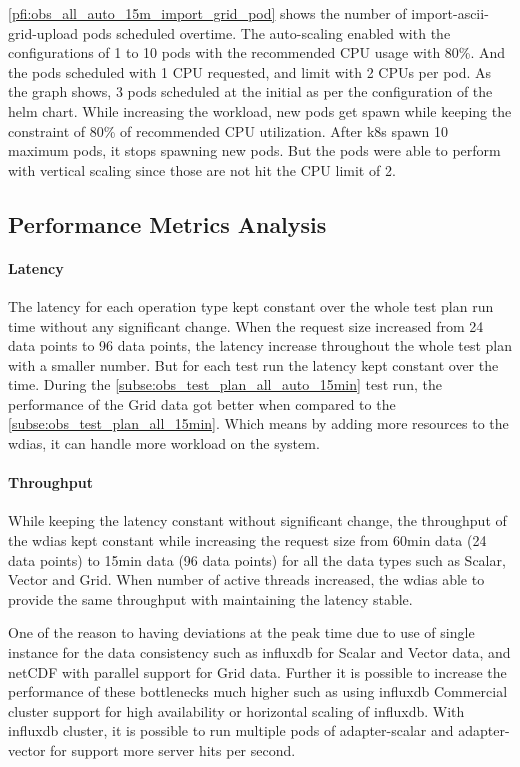 \documentclass[conference]{IEEEtran}
\begin{document}
\cref{pfi:obs_all_auto_15m_import_grid_pod} shows the number of import-ascii-grid-upload pods scheduled overtime. The auto-scaling enabled with the configurations of 1 to 10 pods with the recommended CPU usage with 80\%. And the pods scheduled with 1 CPU requested, and limit with 2 CPUs per pod.
As the graph shows, 3 pods scheduled at the initial as per the configuration of the helm chart. While increasing the workload, new pods get spawn while keeping the constraint of 80\% of recommended CPU utilization. After \acrshort{k8s} spawn 10 maximum pods, it stops spawning new pods. But the pods were able to perform with vertical scaling since those are not hit the CPU limit of 2.

\subsection{Performance Metrics Analysis}
\label{psubse:performance_metrics}
\paragraph{Latency}
The latency for each operation type kept constant over the whole test plan run time without any significant change. When the request size increased from 24 data points to 96 data points, the latency increase throughout the whole test plan with a smaller number. But for each test run the latency kept constant over the time.
During the \cref{subse:obs_test_plan_all_auto_15min} test run, the performance of the Grid data got better when compared to the \cref{subse:obs_test_plan_all_15min}. Which means by adding more resources to the \acrshort{wdias}, it can handle more workload on the system.

\paragraph{Throughput}
While keeping the latency constant without significant change, the throughput of the \acrshort{wdias} kept constant while increasing the request size from 60min data (24 data points) to 15min data (96 data points) for all the data types such as Scalar, Vector and Grid.
When number of active threads increased, the \acrshort{wdias} able to provide the same throughput with maintaining the latency stable.

One of the reason to having deviations at the peak time due to use of single instance for the data consistency such as \acrshort{influxdb} for Scalar and Vector data, and netCDF with parallel support for Grid data. Further it is possible to increase the performance of these bottlenecks much higher such as using \acrshort{influxdb} Commercial cluster support for high availability or horizontal scaling of \acrshort{influxdb}. With \acrshort{influxdb} cluster, it is possible to run multiple pods of adapter-scalar and adapter-vector for support more server hits per second.
\end{document}

